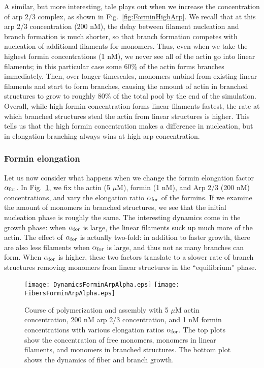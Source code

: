 \documentclass[11pt]{article}
\begin{document}
A similar, but more interesting, tale plays out when we increase the concentration of arp 2/3 complex, as shown in Fig.\ \ref{fig:ForminHighArp}. We recall that at this arp 2/3 concentration (200 nM), the delay between filament nucleation and branch formation is much shorter, so that branch formation competes with nucleation of additional filaments for monomers. Thus, even when we take the highest formin concentrations (1 nM), we never see all of the actin go into linear filaments; in this particular case some 60\% of the actin forms branches immediately. Then, over longer timescales, monomers unbind from existing linear filaments and start to form branches, causing the amount of actin in branched structures to grow to roughly 80\% of the total pool by the end of the simulation. Overall, while high formin concentration forms linear filaments fastest, the rate at which branched structures steal the actin from linear structures is higher. This tells us that the high formin concentration makes a difference in nucleation, but in elongation branching always wins at high arp concentration.

\subsubsection{Formin elongation}
Let us now consider what happens when we change the formin elongation factor $\alpha_\text{for}$. In Fig.\ \ref{fig:ForminArpAlpha}, we fix the actin (5 $\mu$M), formin (1 nM), and Arp 2/3 (200 nM) concentrations, and vary the elongation ratio $\alpha_\text{for}$ of the formins. If we examine the amount of monomers in branched structures, we see that the initial nucleation phase is roughly the same. The interesting dynamics come in the growth phase: when $\alpha_\text{for}$ is large, the linear filaments suck up much more of the actin. The effect of $\alpha_\text{for}$ is actually two-fold: in addition to faster growth, there are also less filaments when $\alpha_\text{for}$ is large, and thus not as many branches can form. When $\alpha_\text{for}$ is higher, these two factors translate to a slower rate of branch structures removing monomers from linear structures in the ``equilibrium'' phase.

\begin{figure}
\centering
\texttt{[image: DynamicsForminArpAlpha.eps]}
\texttt{[image: FibersForminArpAlpha.eps]}
\caption{\label{fig:ForminArpAlpha}Course of polymerization and assembly with 5 $\mu$M actin concentration, 200 nM arp 2/3 concentration, and 1 nM formin concentrations with various elongation ratios $\alpha_\text{for}$. The top plots show the concentration of free monomers, monomers in linear filaments, and monomers in branched structures. The bottom plot shows the dynamics of fiber and branch growth. }
\end{figure}
\end{document}
